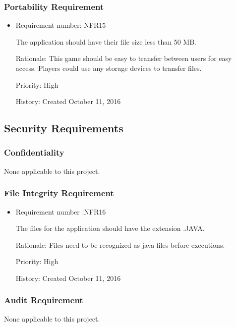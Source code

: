 \documentclass[12pt,letterpaper]{article}
\begin{document}
\subsubsection{Portability Requirement}
\begin{itemize}
	\item Requirement number: NFR15

	The application should have their file size less than 50 MB.

	Rationale: This game should be easy to transfer between users for easy access. Players could use any storage devices to transfer files.

	Priority: High

	History: Created October 11, 2016
\end{itemize}
\subsection{Security Requirements}
\subsubsection{Confidentiality}
None applicable to this project.
\subsubsection{File Integrity Requirement}
\begin{itemize}
	\item Requirement number :NFR16  
	
	The files for the application should have the extension .JAVA.

	Rationale: Files need to be recognized as java files before executions.
	
	Priority: High     
	 
	History: Created October 11, 2016  
\end{itemize}
\subsubsection{Audit Requirement}
None applicable to this project.
\end{document}
